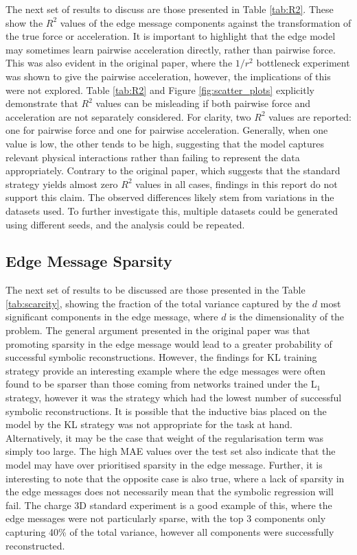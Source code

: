 \documentclass[11pt]{article}
\begin{document}
The next set of results to discuss are those presented in Table \ref{tab:R2}. These show the $R^2$ values of the edge message components against the transformation of the true force or acceleration. It is important to highlight that the edge model may sometimes learn pairwise acceleration directly, rather than pairwise force. This was also evident in the original paper, where the $1/r^2$ bottleneck experiment was shown to give the pairwise acceleration, however, the implications of this were not explored. Table \ref{tab:R2} and Figure \ref{fig:scatter_plots} explicitly demonstrate that $R^2$ values can be misleading if both pairwise force and acceleration are not separately considered. For clarity, two $R^2$ values are reported: one for pairwise force and one for pairwise acceleration. Generally, when one value is low, the other tends to be high, suggesting that the model captures relevant physical interactions rather than failing to represent the data appropriately. Contrary to the original paper, which suggests that the standard strategy yields almost zero $R^2$ values in all cases, findings in this report do not support this claim. The observed differences likely stem from variations in the datasets used. To further investigate this, multiple datasets could be generated using different seeds, and the analysis could be repeated.


\subsection{Edge Message Sparsity}
The next set of results to be discussed are those presented in the Table \ref{tab:scarcity}, showing the fraction of the total variance captured by the $d$ most significant components in the edge message, where $d$ is the dimensionality of the problem. The general argument presented in the original paper was that promoting sparsity in the edge message would lead to a greater probability of successful symbolic reconstructions. However, the findings for KL training strategy provide an interesting example where the edge messages were often found to be sparser than those coming from networks trained under the L$_{1}$ strategy, however it was the strategy which had the lowest number of successful symbolic reconstructions. It is possible that the inductive bias placed on the model by the KL strategy was not appropriate for the task at hand. Alternatively, it may be the case that weight of the regularisation term was simply too large. The high MAE values over the test set also indicate that the model may have over prioritised sparsity in the edge message. Further, it is interesting to note that the opposite case is also true, where a lack of sparsity in the edge messages does not necessarily mean that the symbolic regression will fail. The charge 3D standard experiment is a good example of this, where the edge messages were not particularly sparse, with the top 3 components only capturing 40\% of the total variance, however all components were successfully reconstructed. 
\end{document}

